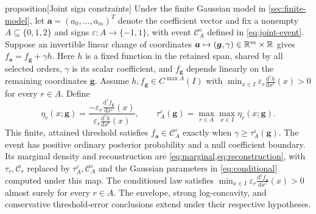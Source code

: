\begin{theoremEnd}[combined main,category=joint]{proposition}[Joint sign constraints]
\label{prop:joint}
Under the finite Gaussian model in \cref{sec:finite-model}, let
$\boldsymbol a=(a_0,\ldots,a_m)^T$ denote the coefficient vector and fix
a nonempty $A\subseteq\{0,1,2\}$ and signs
$\varepsilon:A\to\{-1,1\}$, with event $\mathcal C_A^\varepsilon$ defined in
\cref{eq:joint-event}. Suppose an invertible linear change of coordinates
$\boldsymbol a\mapsto(\boldsymbol g,\gamma)\in\mathbb R^m\times\mathbb R$
gives $f_{\boldsymbol a}=f_{\boldsymbol g}+\gamma h$.
Here $h$ is a fixed function in the retained span, shared by all selected
orders, $\gamma$ is its scalar coefficient, and $f_{\boldsymbol g}$
depends linearly on the remaining coordinates $\boldsymbol g$.
Assume $h,f_{\boldsymbol g}\in C^{\max A}(I)$ with
$\min_{x\in I}\varepsilon_r\frac{\mathrm{d}^rh}{\mathrm{d}x^r}(x)>0$
for every $r\in A$. Define
\begin{equation}\label{eq:joint-threshold}
 \eta_r(x;\boldsymbol g)=
       \frac{-\varepsilon_r\frac{\mathrm{d}^rf_{\boldsymbol g}}{\mathrm{d}x^r}(x)}
            {\varepsilon_r\frac{\mathrm{d}^rh}{\mathrm{d}x^r}(x)},
 \qquad
 \tau_A^\varepsilon(\boldsymbol g)=
       \max_{r\in A}\max_{x\in I}\eta_r(x;\boldsymbol g).
\end{equation}
This finite, attained threshold satisfies
$f_{\boldsymbol a}\in\mathcal C_A^\varepsilon$ exactly when
$\gamma\geq\tau_A^\varepsilon(\boldsymbol g)$.
The event has positive ordinary posterior probability and a null
coefficient boundary. Its marginal density and reconstruction are
\cref{eq:marginal,eq:reconstruction}, with $\tau_r,\mathcal C_r$
replaced by $\tau_A^\varepsilon,\mathcal C_A^\varepsilon$ and the
Gaussian parameters in \cref{eq:conditional} computed under this map.
The conditioned law satisfies
$\min_{x\in I}\varepsilon_r\frac{\mathrm{d}^rf_{\boldsymbol a}}{\mathrm{d}x^r}(x)>0$
almost surely for every $r\in A$. The envelope, strong log-concavity,
and conservative threshold-error conclusions extend under their
respective hypotheses.
\end{theoremEnd}

